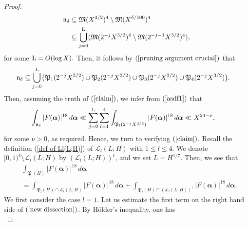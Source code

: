 \documentclass{amsart}%
\numberwithin{equation}{section}
\theoremstyle{remark}
\newcommand{\1}{\mathbbm{1}}
\newcommand{\balp}{\boldsymbol{\alpha}}
\begin{document}
\begin{proof}
\begin{equation}
\begin{aligned}
    \mathfrak{n}_{\delta}&\subseteq \mathfrak{M}(X^{3/2})^4\setminus \mathfrak{M}(X^{\delta/100})^4\\
    &\subseteq\bigcup_{j=0}^{\rm L}(\mathfrak{M}(2^{-j}X^{3/2})^4\setminus \mathfrak{M}(2^{-j-1}X^{3/2})^4), 
\end{aligned}
\end{equation}
for some ${\rm L}=O(\log X).$
Then, it follows by $(\ref{pruning argument crucial})$ that 
\begin{equation}\label{asdf1}
\begin{aligned}
    \mathfrak{n}_{\delta}&\subseteq \bigcup_{j=0}^{\rm L}\bigl(\mathfrak{P}_1(2^{-j}X^{3/2})\cup \mathfrak{P}_2(2^{-j}X^{3/2})\cup\mathfrak{P}_3(2^{-j}X^{3/2})\cup \mathfrak{P}_4(2^{-j}X^{3/2})\bigl).
\end{aligned}
\end{equation}
Then, assuming the truth of $(\ref{claim})$, we infer from $(\ref{asdf1})$  that 
\begin{equation*}\label{reasoning}
\begin{aligned}
\int_{\mathfrak{n}_{\delta}}|F(\boldsymbol{\alpha})|^{18}\, d\boldsymbol{\alpha}&\ll \sum_{j=0}^{\rm L}\sum_{l=1}^4\int_{ \mathfrak{P}_l(2^{-j}X^{3/2})}|F(\boldsymbol{\alpha})|^{18} \, d\boldsymbol{\alpha} \ll X^{24-\nu},
\end{aligned}
\end{equation*}
for some $\nu > 0$, as required.
Hence, we turn to verifying $(\ref{claim}).$
Recall the definition (\ref{def of Ll(L;H)}) of $ \mathcal{L}_{l}(L;H)$ with $1\leq l\leq 4.$ We denote $[0,1)^4\setminus \mathcal{L}_{l}(L;H)$ by $(\mathcal{L}_{l}(L;H))^c$, and we set $L=H^{1/7}$. 
Then, we see that
\begin{equation}\label{new dissection}
\begin{aligned}
&\int_{\mathfrak{P}_l(H)}|F(\boldsymbol{\alpha})|^{18} \, d\balp
\\
&=\int_{\mathfrak{P}_l(H)\cap \mathcal{L}_{l}(L;H)}|F(\boldsymbol{\alpha})|^{18}\, d\balp + \int_{\mathfrak{P}_l(H)\cap (\mathcal{L}_{l}(L;H))^c}|F(\boldsymbol{\alpha})|^{18}\, d\balp.
\end{aligned}
\end{equation}
We first consider the case $l=1.$ 
Let us estimate the first term on the right hand side of $(\ref{new dissection})$. By H\"older's inequality, one has
\begin{equation}\label{mean value over the secondary minor arcs}

\end{equation}
\end{proof}
\end{document}
